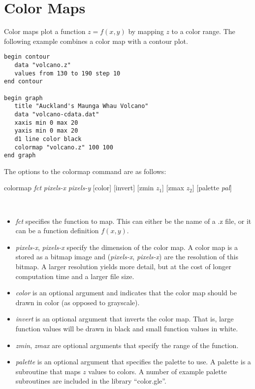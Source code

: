 \section{Color Maps}
\label{colormap}

Color maps plot a function $z = f(x,y)$ by mapping $z$ to a color range. The following example combines a color map with a contour plot.

\begin{minipage}[c]{8cm}
\begin{Verbatim}
begin contour
   data "volcano.z"
   values from 130 to 190 step 10
end contour

begin graph
   title "Auckland's Maunga Whau Volcano"
   data "volcano-cdata.dat"
   xaxis min 0 max 20
   yaxis min 0 max 20
   d1 line color black
   colormap "volcano.z" 100 100
end graph
\end{Verbatim}
\end{minipage}
\hfill
\begin{minipage}[c]{7cm}
\mbox{}
\end{minipage}

The options to the colormap command are as follows:

\begin{commanddescription}
\item[{\sf colormap {\it fct} {\it pixels-x} {\it pixels-y} [color] [invert] [zmin $z_1$]  [zmax $z_2$] [palette {\it pal}]}]

\mbox{}\\
\begin{itemize}
\item {\it fct} specifies the function to map. This can either be the name of a .z file, or it can be a function definition $f(x,y)$.

\item {\it pixels-x}, {\it pixels-x} specify the dimension of the color map. A color map is a stored as a bitmap image and ({\it pixels-x}, {\it pixels-x}) are the resolution of this bitmap. A larger resolution yields more detail, but at the cost of longer computation time and a larger file size.

\item {\it color} is an optional argument and indicates that the color map should be drawn in color (as opposed to grayscale).

\item {\it invert} is an optional argument that inverts the color map. That is, large function values will be drawn in black and small function values in white.

\item {\it zmin}, {\it zmax} are optional arguments that specify the range of the function.

\item {\it palette} is an optional argument that specifies the palette to use. A palette is a subroutine that maps $z$ values to colors. A number of example palette subroutines are included in the library ``color.gle''.
\end{itemize}
\end{commanddescription}

